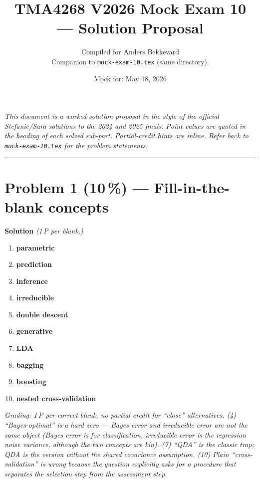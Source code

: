 \documentclass[11pt,a4paper]{article}
\title{TMA4268 V2026 Mock Exam 10 --- Solution Proposal\\[0.3em]
\large}
\author{Compiled for Anders Bekkevard\\[0.2em]
\small Companion to \texttt{mock-exam-10.tex} (same directory).}
\date{Mock for: May 18, 2026}
\newcommand{\points}[1]{\textbf{(#1\,\%)}}
\newcommand{\sol}{\noindent\textbf{Solution}}
\begin{document}
\maketitle

\noindent\textit{This document is a worked-solution proposal in the style of the official Stefanie/Sara solutions
to the 2024 and 2025 finals. Point values are quoted in the heading of each solved sub-part. Partial-credit
hints are inline. Refer back to \texttt{mock-exam-10.tex} for the problem statements.}

\vspace{0.6em}
\hrule
\vspace{1em}

\section*{Problem 1 \points{10} --- Fill-in-the-blank concepts}

\sol{} \emph{(1\,P per blank.)}

\begin{enumerate}[(1)]
  \item \textbf{parametric}
  \item \textbf{prediction}
  \item \textbf{inference}
  \item \textbf{irreducible}
  \item \textbf{double descent}
  \item \textbf{generative}
  \item \textbf{LDA}
  \item \textbf{bagging}
  \item \textbf{boosting}
  \item \textbf{nested cross-validation}
\end{enumerate}

\noindent\emph{Grading: 1\,P per correct blank, no partial credit for ``close'' alternatives. (4) ``Bayes-optimal''
is a hard zero --- Bayes error and irreducible error are not the same object (Bayes error is for
classification, irreducible error is the regression noise variance, although the two concepts are kin).
(7) ``QDA'' is the classic trap; QDA is the version \emph{without} the shared covariance assumption.
(10) Plain ``cross-validation'' is wrong because the question explicitly asks for a procedure that
separates the selection step from the assessment step.}
\end{document}
